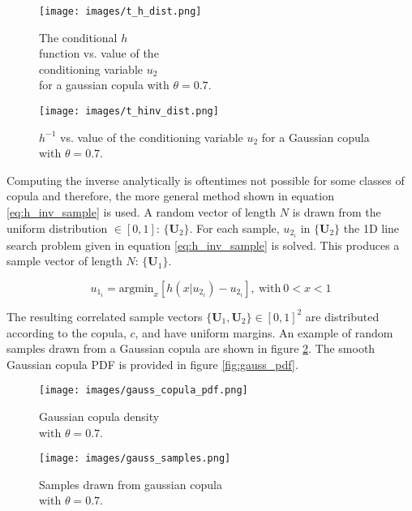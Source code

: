 \begin{figure}[!htbp]
	\centering
	\begin{minipage}{.45\textwidth}
		\texttt{[image: images/t\_h\_dist.png]}
		\caption{The conditional $h$ \\ function vs. value of the \\ conditioning variable $u_2$ \\ for a gaussian copula with $\theta=0.7$.}
		\label{fig:gauss_h}
	\end{minipage}%
	\begin{minipage}{.45\textwidth}
		\texttt{[image: images/t\_hinv\_dist.png]}
		\caption{$h^{-1}$ vs. value of the conditioning variable $u_2$ for a Gaussian copula with $\theta=0.7$.\\}
		\label{fig:gauss_hinv}
	\end{minipage}
\end{figure}

Computing the inverse analytically is oftentimes not possible for some classes of copula and therefore, the more general method shown in equation \ref{eq:h_inv_sample} is used.
A random vector of length $N$ is drawn from the uniform distribution $\in [0, 1]$:  $\{\mathbf U_2\}$.  For each sample, $u_{2_i}$ in $\{\mathbf U_2\}$ the 1D line search problem given in equation \ref{eq:h_inv_sample} is solved.  This produces a sample vector of length $N$: $\{\mathbf U_1\}$.

\begin{equation}
u_{1_i} = \mathrm{argmin}_{x} \left[ h(x|u_{2_i}) - u_{2_i} \right],\ \mathrm{with}\ 0 < x < 1
\label{eq:h_inv_sample}
\end{equation}

The resulting correlated sample vectors $\{\mathbf U_1, \mathbf U_2\} \in [0,1]^2$ are distributed according to the copula, $c$, and have uniform margins.  An example of random samples drawn from a Gaussian copula are shown in figure \ref{fig:gauss_samples}.  The smooth Gaussian copula PDF is provided in figure \ref{fig:gauss_pdf}.

\begin{figure}[!htbp]
	\centering
	\begin{minipage}{.45\textwidth}
		\texttt{[image: images/gauss\_copula\_pdf.png]}
		\caption{Gaussian copula density\\ with $\theta=0.7$.}
		\label{fig:gauss_pdf}
	\end{minipage}%
	\begin{minipage}{.45\textwidth}
		\texttt{[image: images/gauss\_samples.png]}
		\caption{Samples drawn from gaussian copula\\ with $\theta=0.7$.}
		\label{fig:gauss_samples}
	\end{minipage}
\end{figure}

